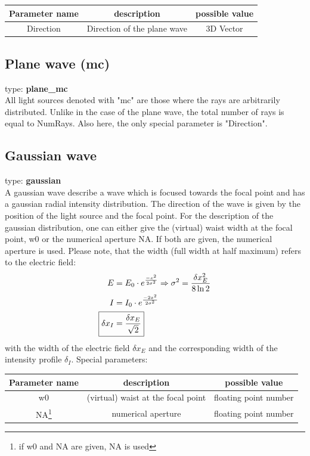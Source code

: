 \documentclass[a4paper,html,11pt,openany]{book}
\begin{document}
\vspace{1em} 
  \begin{tabular}{c|c|c}
 Parameter name & description  & possible value \\
 \hline
 Direction & Direction of the plane wave & 3D Vector  
 \end{tabular}
 
 \subsection{Plane wave (mc)} 
 type: \textbf{plane\_mc} \\
 All light sources denoted with "mc" are those where the rays are arbitrarily distributed. Unlike in the case of the plane wave, the total number of rays is equal to NumRays. Also here, the only special parameter is "Direction". 
 
\subsection{Gaussian wave}
 type: \textbf{gaussian} \\
A gaussian wave describe a wave which is focused  towards the focal point and has a gaussian radial intensity distribution. The direction of the wave is given by the position of the light source and the focal point. For the description of the gaussian distribution, one can either give the (virtual) waist width at the focal point, w0 or the numerical aperture NA. If both are given, the numerical aperture is used. Please note, that the width (full width at half maximum) refers to the electric field: \\ 

\begin{align}
E&=E_0 \cdot e^{\frac{-x^2}{2\sigma^2}} \Rightarrow \sigma^2=\frac{\delta x_E^2}{8\ln2} \\
I&=I_0 \cdot e^{\frac{-2x^2}{2\sigma^2}} \\
\Aboxed {\delta x_I&=\frac{\delta x_E}{\sqrt{2}}}
\end{align}
with the width of the electric field $\delta x_E$ and the corresponding width of the intensity profile $\delta_I$.
\vspace{1em}
Special parameters:

\vspace{1em}
 \begin{tabular}{c|c|c}
 Parameter name & description  & possible value \\
 \hline
 w0 & (virtual) waist at the focal point & floating point number \\
 \hline
 NA\footnote{if w0 and NA are given, NA is used} & numerical aperture & floating point number \\ 
 \end{tabular}
\end{document}
